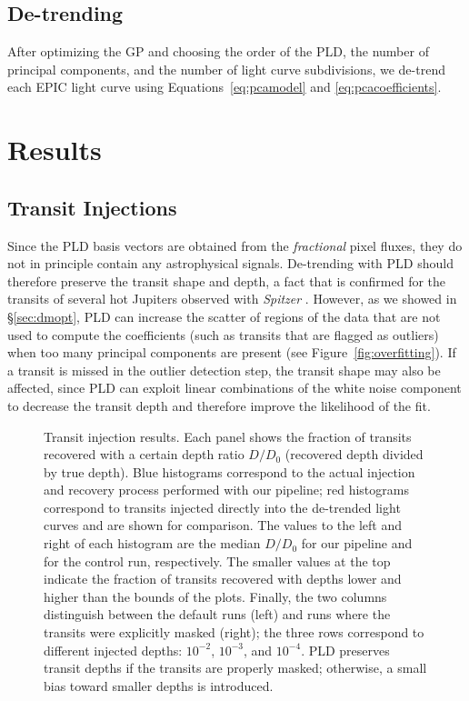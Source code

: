 \documentclass[]{emulateapj}
\begin{document}
\subsection{De-trending}
After optimizing the GP and choosing the order of the PLD, the number of principal components, and the 
number of light curve subdivisions, we de-trend each EPIC light curve using
Equations~\ref{eq:pcamodel} and \ref{eq:pcacoefficients}.

\section{Results}
\label{sec:results}
\subsection{Transit Injections}
\label{sec:injections}
Since the PLD basis vectors are obtained from the \emph{fractional} pixel fluxes,
they do not in principle contain any astrophysical signals. De-trending with PLD
should therefore preserve the transit shape and depth, a fact that is confirmed
for the transits of several hot Jupiters observed with \emph{Spitzer} \citep{DEM15}.
However, as we showed in \S\ref{sec:dmopt}, PLD can increase the
scatter of regions of the data that are not used to compute the coefficients
(such as transits that are flagged as outliers) when too many principal components 
are present (see Figure~\ref{fig:overfitting}). If a transit is missed in the
outlier detection step, the transit shape may also be affected,
since PLD can exploit linear combinations of the white noise component
to decrease the transit depth and therefore improve the likelihood of the fit.

\begin{figure}[h]
  \begin{center}
       \caption{Transit injection results. Each panel shows the fraction of transits
                recovered with a certain depth ratio $D/D_0$ (recovered depth divided
                by true depth). Blue histograms correspond to the actual injection
                and recovery process performed with our pipeline; red histograms
                correspond to transits injected directly into the de-trended
                light curves and are shown for comparison. The values to the left
                and right of each histogram are the median $D/D_0$ for our pipeline
                and for the control run, respectively. The smaller values at the
                top indicate the fraction of transits recovered with depths lower and
                higher than the bounds of the plots. Finally, the two columns distinguish
                between the default runs (left) and runs
                where the transits were explicitly masked (right); the three rows correspond to different
                injected depths: $10^{-2}$, $10^{-3}$, and $10^{-4}$. PLD preserves
                transit depths if the transits are properly masked; otherwise, a small bias
                toward smaller depths is introduced.}
     \label{fig:injections}
  \end{center}
\end{figure}
\end{document}
